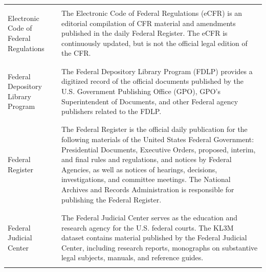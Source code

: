 \begin{table}[h!]
\begin{longtable}{ p{3cm} p{9cm} }
 \\\hline
  \\
Electronic Code of Federal Regulations &
The Electronic Code of Federal Regulations (eCFR) is an editorial compilation of CFR material and amendments published in the daily Federal Register. The eCFR is continuously updated, but is not the official legal edition of the CFR.
\\
 \\\hline
  \\
Federal Depository
Library Program &
The Federal Depository Library Program (FDLP) provides a digitized record of the official documents published by the U.S. Government Publishing Office (GPO), GPO’s Superintendent of Documents, and other Federal agency publishers related to the FDLP.
\\
 \\\hline
  \\
Federal Register &
The Federal Register is the official daily publication for the following materials of the United States Federal Government: Presidential Documents, Executive Orders, proposed, interim, and final rules and regulations, and notices by Federal Agencies, as well as notices of hearings, decisions, investigations, and committee meetings. The National Archives and Records Administration is responsible for publishing the Federal Register.
\\
 \\\hline
  \\
Federal Judicial Center &
The Federal Judicial Center serves as the education and research agency for the U.S. federal courts. The KL3M dataset contains material published by the Federal Judicial Center, including research reports, monographs on substantive legal subjects, manuals, and reference guides.
\\
 \\\hline
    \end{longtable}

\end{table}
\pagebreak

